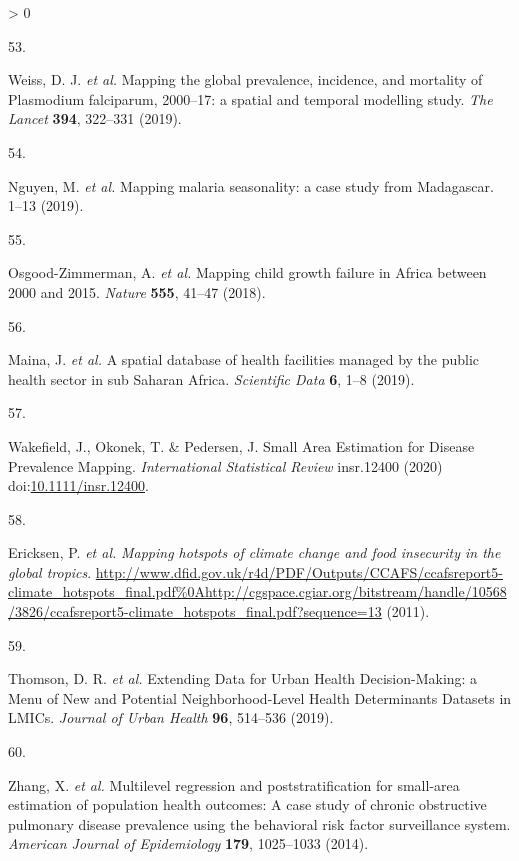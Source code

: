 \documentclass[
]{article}
\newlength{\cslhangindent}
\newlength{\csllabelwidth}
\newenvironment{CSLReferences}[2] %
 {%
  \setlength{\parindent}{0pt}
  \ifodd #1 \everypar{\setlength{\hangindent}{\cslhangindent}}\ignorespaces\fi
  \ifnum #2 > 0
  \setlength{\parskip}{#2\baselineskip}
  \fi
 }%
 {}
\newcommand{\CSLLeftMargin}[1]{\parbox[t]{\csllabelwidth}{#1}}
\newcommand{\CSLRightInline}[1]{\parbox[t]{\linewidth - \csllabelwidth}{#1}\break}
\begin{document}
\begin{CSLReferences}{0}{0}
\leavevmode\hypertarget{ref-Weiss2019}{}%
\CSLLeftMargin{53. }
\CSLRightInline{Weiss, D. J. \emph{et al.} {Mapping the global prevalence, incidence, and mortality of Plasmodium falciparum, 2000--17: a spatial and temporal modelling study}. \emph{The Lancet} \textbf{394}, 322--331 (2019).}

\leavevmode\hypertarget{ref-Nguyen2019}{}%
\CSLLeftMargin{54. }
\CSLRightInline{Nguyen, M. \emph{et al.} {Mapping malaria seasonality: a case study from Madagascar}. 1--13 (2019).}

\leavevmode\hypertarget{ref-Osgood-Zimmerman2018}{}%
\CSLLeftMargin{55. }
\CSLRightInline{Osgood-Zimmerman, A. \emph{et al.} {Mapping child growth failure in Africa between 2000 and 2015}. \emph{Nature} \textbf{555}, 41--47 (2018).}

\leavevmode\hypertarget{ref-Maina2019}{}%
\CSLLeftMargin{56. }
\CSLRightInline{Maina, J. \emph{et al.} {A spatial database of health facilities managed by the public health sector in sub Saharan Africa}. \emph{Scientific Data} \textbf{6}, 1--8 (2019).}

\leavevmode\hypertarget{ref-Wakefield2020}{}%
\CSLLeftMargin{57. }
\CSLRightInline{Wakefield, J., Okonek, T. \& Pedersen, J. {Small Area Estimation for Disease Prevalence Mapping}. \emph{International Statistical Review} insr.12400 (2020) doi:\href{https://doi.org/10.1111/insr.12400}{10.1111/insr.12400}.}

\leavevmode\hypertarget{ref-Ericksen2011}{}%
\CSLLeftMargin{58. }
\CSLRightInline{Ericksen, P. \emph{et al.} \emph{{Mapping hotspots of climate change and food insecurity in the global tropics}}. \url{http://www.dfid.gov.uk/r4d/PDF/Outputs/CCAFS/ccafsreport5-climate_hotspots_final.pdf\%0Ahttp://cgspace.cgiar.org/bitstream/handle/10568/3826/ccafsreport5-climate_hotspots_final.pdf?sequence=13} (2011).}

\leavevmode\hypertarget{ref-Thomson2019}{}%
\CSLLeftMargin{59. }
\CSLRightInline{Thomson, D. R. \emph{et al.} {Extending Data for Urban Health Decision-Making: a Menu of New and Potential Neighborhood-Level Health Determinants Datasets in LMICs}. \emph{Journal of Urban Health} \textbf{96}, 514--536 (2019).}

\leavevmode\hypertarget{ref-Zhang2014}{}%
\CSLLeftMargin{60. }
\CSLRightInline{Zhang, X. \emph{et al.} {Multilevel regression and poststratification for small-area estimation of population health outcomes: A case study of chronic obstructive pulmonary disease prevalence using the behavioral risk factor surveillance system}. \emph{American Journal of Epidemiology} \textbf{179}, 1025--1033 (2014).}


\end{CSLReferences}
\end{document}
